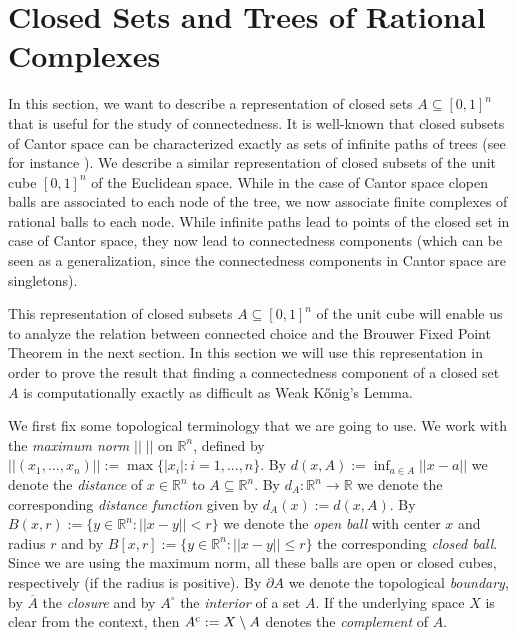 \documentclass[a4paper]{amsart}
\def\IR{{\mathbb{R}}}
\def\In{\subseteq}
\theoremstyle{definition}
\begin{document}
\section{Closed Sets and Trees of Rational Complexes}
\label{sec:closed-sets-trees}

In this section, we want to describe a representation of closed sets $A\In[0,1]^n$ that is useful for the study of connectedness. 
It is well-known that closed subsets of Cantor space can be characterized exactly as sets of infinite paths of trees (see for instance \cite{CR98}).
We describe a similar representation of closed subsets of the unit cube $[0,1]^n$ of the Euclidean space.
While in the case of Cantor space clopen balls are associated to each node of the tree, we now associate
finite complexes of rational balls to each node. While infinite paths lead to points of the closed set in case of Cantor space,
they now lead to connectedness components (which can be seen as a generalization, since the connectedness components in
Cantor space are singletons).

This representation of closed subsets $A\In[0,1]^n$ of the unit cube will enable us to analyze the relation between connected
choice and the Brouwer Fixed Point Theorem in the next section. In this section we will use this representation
in order to prove the result that finding a connectedness component of a closed set $A$ is computationally exactly as difficult
as Weak K\H{o}nig's Lemma. 

We first fix some topological terminology that we are going to use.
We work with the {\em maximum norm} $||\;||$ on $\IR^n$, defined by $||(x_1,...,x_n)||:=\max\{|x_i|:i=1,...,n\}$.
By $d(x,A):=\inf_{a\in A}||x-a||$ we denote the {\em distance} of $x\in\IR^n$ to $A\In\IR^n$.
By $d_A:\IR^n\to\IR$ we denote the corresponding {\em distance function} given by $d_A(x):=d(x,A)$.
By $B(x,r):=\{y\in\IR^n:||x-y||<r\}$ we denote the {\em open ball} with center $x$ and radius $r$ and by
$B[x,r]:=\{y\in\IR^n:||x-y||\leq r\}$ the corresponding {\em closed ball}.
Since we are using the maximum norm, all these balls are open or closed cubes, respectively (if the radius is positive).
By $\partial A$ we denote the topological {\em boundary},
by $\overline{A}$ the {\em closure} and by $A^\circ$ the {\em interior} of a set $A$.
If the underlying space $X$ is clear from the context, then $A^{\rm c}:=X\setminus A$ denotes the {\em complement} of $A$.
\end{document}
